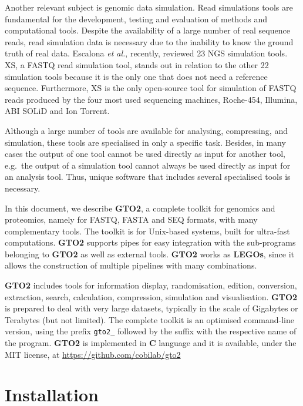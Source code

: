 \documentclass[11pt,]{krantz}
\begin{document}
Another relevant subject is genomic data simulation. Read simulations
tools are fundamental for the development, testing and evaluation of
methods and computational tools\citep[price2017simulome]{huang2011art}.
Despite the availability of a large number of real sequence reads, read
simulation data is necessary due to the inability to know the ground
truth of real data\citep{baruzzo2017simulation}. Escalona
\textit{et al.}\citep{escalona2016comparison}, recently, reviewed 23 NGS
simulation tools. XS\citep{pratas2014xs}, a FASTQ read simulation tool,
stands out in relation to the other 22 simulation tools because it is
the only one that does not need a reference sequence. Furthermore, XS is
the only open-source tool for simulation of FASTQ reads produced by the
four most used sequencing machines, Roche-454, Illumina, ABI SOLiD and
Ion Torrent.

Although a large number of tools are available for analysing,
compressing, and simulation, these tools are specialised in only a
specific task. Besides, in many cases the output of one tool cannot be
used directly as input for another tool, e.g.~the output of a simulation
tool cannot always be used directly as input for an analysis tool. Thus,
unique software that includes several specialised tools is necessary.

In this document, we describe \textbf{GTO2}, a complete toolkit for
genomics and proteomics, namely for FASTQ, FASTA and SEQ formats, with
many complementary tools. The toolkit is for Unix-based systems, built
for ultra-fast computations. \textbf{GTO2} supports pipes for easy
integration with the sub-programs belonging to \textbf{GTO2} as well as
external tools. \textbf{GTO2} works as \textbf{LEGOs}, since it allows
the construction of multiple pipelines with many combinations.

\textbf{GTO2} includes tools for information display, randomisation,
edition, conversion, extraction, search, calculation, compression,
simulation and visualisation. \textbf{GTO2} is prepared to deal with
very large datasets, typically in the scale of Gigabytes or Terabytes
(but not limited). The complete toolkit is an optimised command-line
version, using the prefix \texttt{gto2\_} followed by the suffix with
the respective name of the program. \textbf{GTO2} is implemented in
\textbf{C} language and it is available, under the MIT license, at
\url{https://github.com/cobilab/gto2}

\section{Installation}\label{installation}
\end{document}
